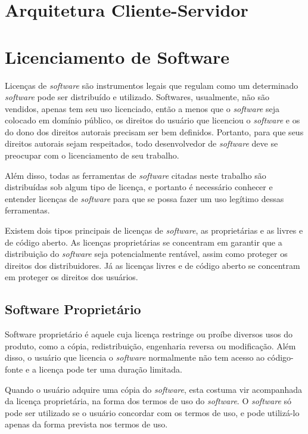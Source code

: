 \section{Arquitetura Cliente-Servidor}

\section{Licenciamento de Software}

Licenças de \emph{software} são instrumentos legais que regulam como um determinado \emph{software} pode ser distribuído e utilizado.
Softwares, usualmente, não são vendidos, apenas tem seu uso licenciado, então a menos que o \emph{software} seja colocado em domínio público, os direitos do usuário que licenciou o \emph{software} e os do dono dos direitos autorais precisam ser bem definidos. Portanto, para que seus direitos autorais sejam respeitados, todo desenvolvedor de \emph{software} deve se preocupar com o licenciamento de seu trabalho.

Além disso, todas as ferramentas de \emph{software} citadas neste trabalho são distribuídas sob algum tipo de licença, e portanto é necessário conhecer e entender licenças de \emph{software} para que se possa fazer um uso legítimo dessas ferramentas.

Existem dois tipos principais de licenças de \emph{software}, as proprietárias e as livres e de código aberto. As licenças proprietárias se concentram em garantir que a distribuição do \emph{software} seja potencialmente rentável, assim como proteger os direitos dos distribuidores. Já as licenças livres e de código aberto se concentram em proteger os direitos dos usuários.

\subsection{Software Proprietário} 

Software proprietário é aquele cuja licença restringe ou proíbe diversos usos do produto, como a cópia, redistribuição, engenharia reversa ou modificação. Além disso, o usuário que licencia o \emph{software} normalmente não tem acesso ao código-fonte e a licença pode ter uma duração limitada.

Quando o usuário adquire uma cópia do \emph{software}, esta costuma vir acompanhada da licença proprietária, na forma dos termos de uso do \emph{software}. O \emph{software} só pode ser utilizado se o usuário concordar com os termos de uso, e pode utilizá-lo apenas da forma prevista nos termos de uso.

